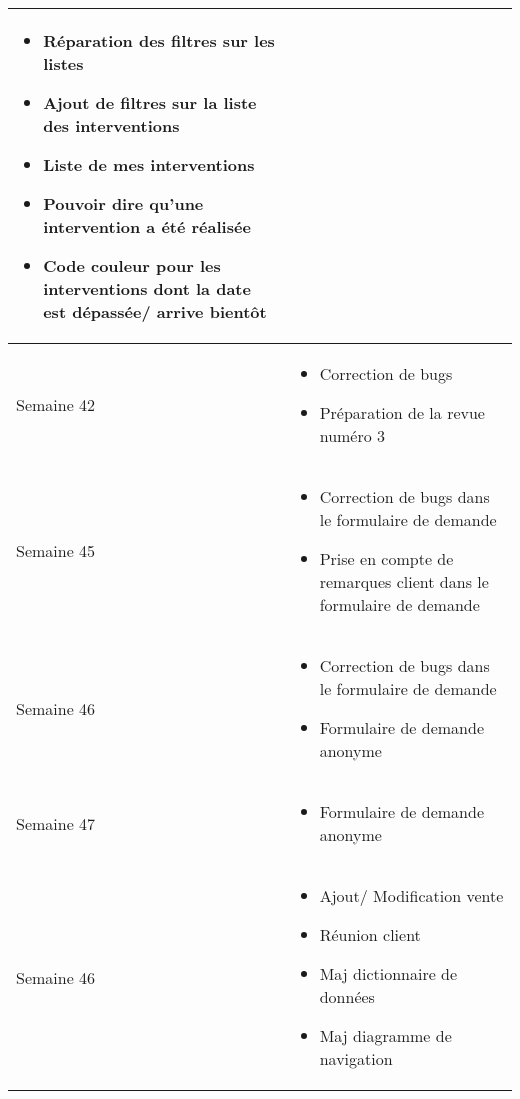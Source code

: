 \documentclass [a4paper] {article}
\begin{document}
\begin{longtable}{|>{\columncolor{gray!40}}p{2cm}|p{12cm}|}
\begin{itemize}
	\item Réparation des filtres sur les listes 
	\item Ajout de filtres sur la liste des interventions 
	\item Liste de mes interventions
	\item Pouvoir dire qu'une intervention a été réalisée
	\item Code couleur pour les interventions dont la date est dépassée/ arrive bientôt
	\end{itemize} \\
	\hline
	Semaine 42 & \begin{itemize}
	\item Correction de bugs
	\item Préparation de la revue numéro 3
	\end{itemize} \\
	\hline
	Semaine 45 & \begin{itemize}
	\item Correction de bugs dans le formulaire de demande
	\item Prise en compte de remarques client dans le formulaire de demande
	\end{itemize} \\
	\hline
	Semaine 46 & \begin{itemize}
	\item Correction de bugs dans le formulaire de demande
	\item Formulaire de demande anonyme
	\end{itemize} \\
	\hline
	Semaine 47 & \begin{itemize}
	\item Formulaire de demande anonyme
	\end{itemize} \\
	\hline
	Semaine 46 & \begin{itemize}
	\item Ajout/ Modification vente
	\item Réunion client
	\item Maj dictionnaire de données
	\item Maj diagramme de navigation
	\end{itemize} \\
	\hline
\end{longtable}
\end{document}
